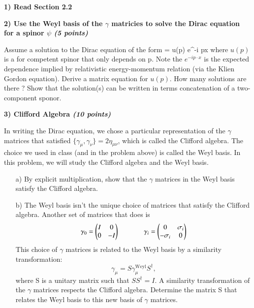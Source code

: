 {\large

\textbf{1) Read Section 2.2 }

\vspace*{0.5in}

\textbf{2) Use the Weyl basis of the $\gamma$ matricies to solve the Dirac equation for a spinor $\psi$ \hfill \textit{(5 points)} }

Assume a solution to the Dirac equation of the form
\be
\psi = u(p) e^{-i p\cdot x}
\ee
where $u(p)$ is a for competent spinor that only depends on p.
Note the $e^{-i p\cdot x}$ is the expected dependence implied by relativistic energy-momentum relation (via the Klien Gordon equation).
Derive a matrix equation for $u(p)$.
How many solutions are there ?
Show that the solution(s) can be written in terms concatenation of a two-component sponor.

\vspace*{0.5in}

\textbf{3) Clifford Algebra \hfill \textit{(10 points)} }

In writing the Dirac equation, we chose a particular representation of the $\gamma$ matrices that satisfied $\{\gamma_\mu,\gamma_\nu\} = 2\eta_{\mu\nu}$, which is called the Clifford algebra. 
The choice we used in class (and in the problem above) is called the Weyl basis.
In this problem, we will study the Clifford algebra and the Weyl basis.
\begin{itemize}
\item[a)]
By explicit multiplication, show that the $\gamma$ matrices in the Weyl basis satisfy the Clifford algebra.
\item[b)]
The Weyl basis isn’t the unique choice of matrices that satisfy the Clifford algebra. 
Another set of matrices that does is
\begin{equation*}
\gamma_0 = \begin{pmatrix} I &  0 \\ 0 & -I \end{pmatrix} \hspace{0.5in} \gamma_i = \begin{pmatrix} 0 & \sigma_i \\  -\sigma_i & 0 \end{pmatrix}
\end{equation*}
This choice of $\gamma$ matrices is related to the Weyl basis by a similarity transformation:
\begin{equation*}
\gamma_\mu = S\gamma_\mu^{\mathrm{Weyl}}S^\dagger, 
\end{equation*}
where S is a unitary matrix such that $SS^\dagger = I$.
A similarity transformation of the $\gamma$ matrices respects the Clifford algebra. 
Determine the matrix S that relates the Weyl basis to this new basis of $\gamma$ matrices.


\end{itemize}}

